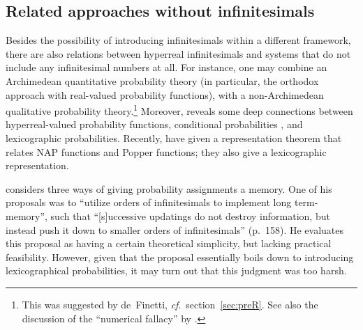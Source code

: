 \subsection{Related approaches without infinitesimals}
Besides the possibility of introducing infinitesimals within a different framework, there are also relations between hyperreal infinitesimals and systems that do not include any infinitesimal numbers at all. For instance, one may combine an Archimedean quantitative probability theory (in particular, the orthodox approach with real-valued probability functions), with a non-Archimedean qualitative probability theory.\footnote{This was suggested by de~Finetti, \textit{cf}.\ section~\ref{sec:preR}. See also the discussion of the ``numerical fallacy'' by \citet{Easwaran:2014}.} Moreover, \citet{Halpern:2010} reveals some deep connections between hyperreal-valued probability functions, conditional probabilities \citep[including Popper functions; see also Vann][]{McGee:1994}, and lexicographic probabilities. Recently, \citet{BrickhillHorsten:2018} have given a representation theorem that relates NAP functions and Popper functions; they also give a lexicographic representation.

\citet{Skyrms:1983b} considers three ways of giving probability assignments a memory. One of his proposals was to ``utilize orders of infinitesimals to implement long term-memory'', such that ``[s]uccessive updatings do not destroy information, but instead push it down to smaller orders of infinitesimals'' (p.~158).
He evaluates this proposal as having a certain theoretical simplicity, but lacking practical feasibility. However, given that the proposal essentially boils down to introducing lexicographical probabilities, it may turn out that this judgment was too harsh.


